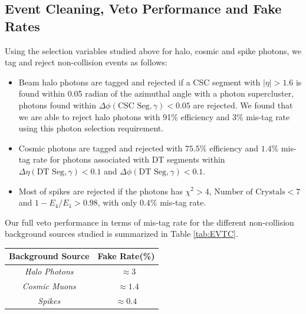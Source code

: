 \subsection{Event Cleaning, Veto Performance and Fake Rates}
Using the selection variables studied above for halo, cosmic and spike photons, we tag and reject non-collision events as follows: 
\begin{itemize}
\item Beam halo photons are tagged and rejected if a CSC segment with $|\eta| > 1.6$ is found within 0.05 radian of the azimuthal angle with a photon supercluster, \ie photons found within $\Delta\phi(\mbox{CSC Seg},\gamma) < 0.05$ are rejected. We found that we are able to reject halo photons with 91\% efficiency and 3\% mis-tag rate using this photon selection requirement.
\item Cosmic photons are tagged and rejected with $75.5$\% efficiency and $1.4$\% mis-tag rate for photons associated with DT segments within $\Delta\eta(\mbox{DT Seg},\gamma) < 0.1$ and $\Delta\phi(\mbox{DT Seg},\gamma) < 0.1$.
\item Most of spikes are rejected if the photons has $\chi^{2} > 4$, $\mbox{Number of Crystals} < 7$ and $ 1-E_{4}/E_{1} > 0.98$, with only $0.4$\% mis-tag rate.
\end{itemize}
Our full veto performance in terms of mis-tag rate for the different non-collision background sources studied  is summarized in Table \ref{tab:EVTC}.

\begin{minipage}{0.90\linewidth} 
\begin{center}
\begin{tabular}{|c| c|}
\hline
\bfseries{Background Source} & \bfseries {Fake Rate}(\%)\\
\hline\hline
\textit{Halo Photons} & ~$\approx 3$ \\
\textit{Cosmic Muons} & ~$\approx 1.4$ \\
\textit{Spikes} & $\approx 0.4$ \\
\hline
\end{tabular}
\label{tab:EVTC} 
\end{center}
\end{minipage}

